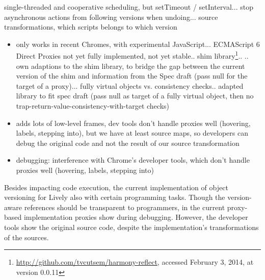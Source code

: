 single-threaded and cooperative scheduling, but setTimeout / setInterval... stop asynchronous actions from following versions when undoing... source transformations, which scripts belongs to which version



\begin{itemize}
    \item only works in recent Chromes, with experimental JavaScript... ECMAScript 6 Direct Proxies not yet fully implemented, not yet stable.. shim library\footnote{\url{http://github.com/tvcutsem/harmony-reflect}, accessed February 3, 2014, at version 0.0.11}..
.. own adaptions to the shim library, to bridge the gap between the current version of the shim and information from the Spec draft (pass null for the target of a proxy)... fully virtual objects vs. consistency checks.. adapted library to fit spec draft (pass null as target of a fully virtual object, then no trap-return-value-consistency-with-target checks)
\end{itemize}
    






\begin{itemize}
    \item adds lots of low-level frames, dev tools don’t handle proxies well (hovering, labels, stepping into), but we have at least source maps, so developers can debug the original code and not the result of our source transformation
    \item debugging: interference with Chrome's developer tools, which don’t handle proxies well (hovering, labels, stepping into)
\end{itemize}


Besides impacting code execution, the current implementation of object versioning for Lively also  with certain programming tasks.
Though the version-aware references should be transparent to programmers, in the current proxy-based implementation proxies show during debugging.
However, the developer tools show the original source code, despite the implementation's transformations of the sources.
